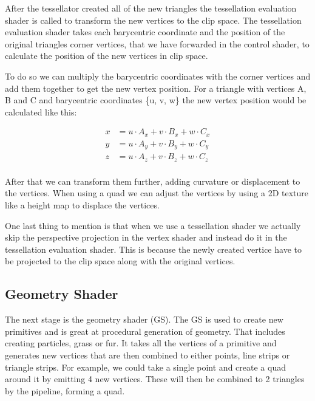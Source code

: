 \documentclass[12pt]{report} \usepackage{preamble}
\begin{document}
After the tessellator created all of the new triangles the tessellation evaluation shader
is called to transform the new vertices to the clip space.
The tessellation evaluation shader takes each barycentric coordinate
and the position of the original triangles corner vertices, that we have forwarded in
the control shader, to calculate the position of the new vertices in clip space. \cite{tessellation}

To do so we can multiply the barycentric coordinates with the corner vertices
and add them together to get the new vertex position.
For a triangle with vertices A, B and C and barycentric coordinates \{u, v, w\}
the new vertex position would be calculated like this:

\[
	\begin{aligned}
		x & = u \cdot A_x + v \cdot B_x + w \cdot C_x \\
		y & = u \cdot A_y + v \cdot B_y + w \cdot C_y \\
		z & = u \cdot A_z + v \cdot B_z + w \cdot C_z \\
	\end{aligned}
\]

After that we can transform them further, adding curvature or displacement to the vertices.
When using a quad we can adjust the vertices
by using a 2D texture like a height map to displace the vertices. \cite{tessellation}

One last thing to mention is that when we use a tessellation shader
we actually skip the perspective projection in the vertex shader and
instead do it in the tessellation evaluation shader.
This is because the newly created vertice have to be projected to the clip space
along with the original vertices. \cite{tessellation}

\subsection{Geometry Shader}

The next stage is the geometry shader (GS). The GS is used to create new
primitives and is great at procedural generation of geometry.
That includes creating particles, grass or fur. It takes all the vertices of a primitive
and generates new vertices that are then combined to
either points, line strips or triangle strips.
For example, we could take a single point and create a quad around it by emitting 4 new vertices.
These will then be combined to 2 triangles by the pipeline, forming a quad. \cite{geometry-shader}
\end{document}
